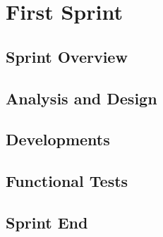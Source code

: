 \chapter{First Sprint}\label{chap:sprint1}

\section{Sprint Overview}\label{sec:sprint1:overview}


\section{Analysis and Design}\label{sec:sprint1:analysis}




\section{Developments}\label{sec:sprint1:developments}


%




\section{Functional Tests}\label{sec:sprint1:testing}



\section{Sprint End}\label{sec:sprint1:review}
